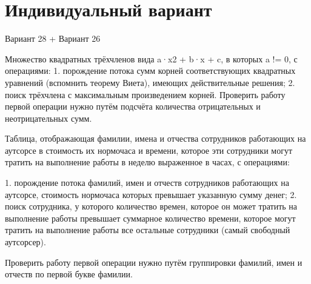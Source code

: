 \documentclass[a4paper, 14pt]{extarticle}
\begin{document}
\section{Индивидуальный вариант}
\par
Вариант 28 + Вариант 26
\par 
Множество квадратных трёхчленов вида a·x2 + b·x + c, в которых a != 0, с операциями: 
1. порождение потока сумм корней соответствующих квадратных уравнений (вспомнить теорему Виета), имеющих действительные решения; 
2. поиск трёхчлена с максимальным произведением корней. 
Проверить работу первой операции нужно путём подсчёта количества отрицательных и неотрицательных сумм. 

\par
Таблица, отображающая фамилии, имена и отчества сотрудников работающих на аутсорсе в стоимость их нормочаса и времени, которое эти сотрудники могут тратить на выполнение работы в неделю выраженное в часах, с операциями: 

1. порождение потока фамилий, имен и отчеств сотрудников работающих на аутсорсе, стоимость нормочаса которых превышает указанную сумму денег; 
2. поиск сотрудника, у которого количество времен, которое он может тратить на выполнение работы превышает суммарное количество времени, которое могут тратить на выполнение работы все остальные сотрудники (самый свободный аутсорсер). 

Проверить работу первой операции нужно путём группировки фамилий, имен и отчеств по первой букве фамилии. 
\end{document}
